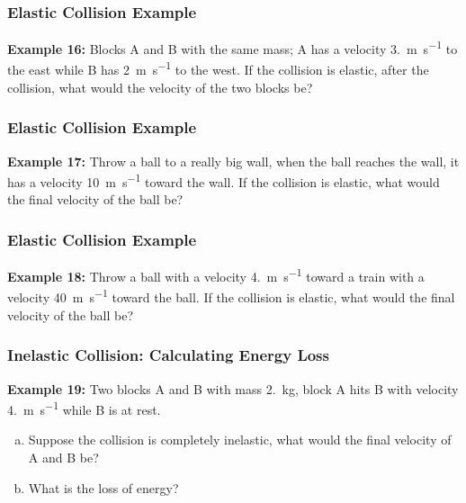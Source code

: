 \documentclass[12pt,compress,aspectratio=169]{beamer}
\begin{document}
\begin{frame}
  \frametitle{Elastic Collision Example}
  \textbf{Example 16:} Blocks A and B with the same mass; A has a velocity
  \SI{3.}{\metre\per\second} to the east while B has \SI{2}{\metre\per\second}
  to the west. If the collision is elastic, after the collision, what would the
  velocity of the two blocks be?
\end{frame}


\begin{frame}
  \frametitle{Elastic Collision Example}
  
  \textbf{Example 17:} Throw a ball to a really big wall, when the ball reaches
  the wall, it has a velocity \SI{10}{\metre\per\second} toward the wall. If
  the collision is elastic, what would the final velocity of the ball be?
\end{frame}


\begin{frame}
  \frametitle{Elastic Collision Example}
  \textbf{Example 18:} Throw a ball with a velocity \SI{4.}{\metre\per\second}
  toward a train with a velocity \SI{40}{\metre\per\second} toward the ball.
  If the collision is elastic, what would the final velocity of the ball be?
\end{frame}


\begin{frame}
  \frametitle{Inelastic Collision: Calculating Energy Loss}
  \textbf{Example 19:} Two blocks A and B with mass \SI{2.}{\kilo\gram}, block
  A hits B with velocity \SI{4.}{\metre\per\second} while B is at rest.
  \begin{enumerate}[(a)]
  \item Suppose the collision is completely inelastic, what would the final
    velocity of A and B be?
  \item What is the loss of energy?
  \end{enumerate}
\end{frame}
\end{document}
